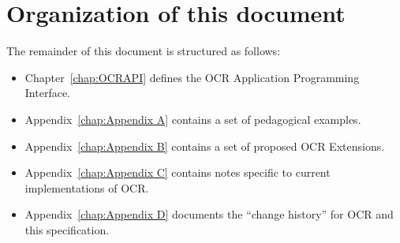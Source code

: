 %





\section{Organization of this document}
\label{sec:Organization of this document}
%

The remainder of this document is structured as follows:

\begin{itemize}
\item Chapter~\ref{chap:OCRAPI} defines the OCR Application Programming Interface.

\item Appendix~\ref{chap:Appendix A} contains a set of pedagogical examples.

\item Appendix~\ref{chap:Appendix B} contains a set of proposed OCR Extensions.

\item Appendix~\ref{chap:Appendix C} contains notes specific to current implementations of OCR.

\item Appendix~\ref{chap:Appendix D} documents the ``change history''
  for OCR and this specification.
\end{itemize}


